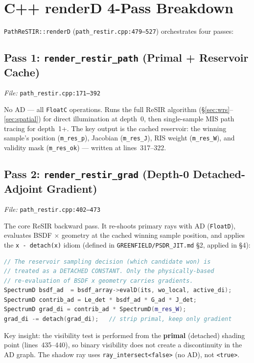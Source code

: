\section{C++ renderD 4-Pass Breakdown}
\label{sec:renderd}

\texttt{PathReSTIR::renderD} (\texttt{path\_restir.cpp:479--527}) orchestrates
four passes:

\subsection{Pass 1: \texttt{render\_restir\_path} (Primal + Reservoir Cache)}

\emph{File:} \texttt{path\_restir.cpp:171--392}

No AD --- all \texttt{FloatC} operations. Runs the full ReSIR algorithm
(\S\ref{sec:wrs}--\ref{sec:spatial}) for direct illumination at depth~0,
then single-sample MIS path tracing for depth~1+. The key output is the
cached reservoir: the winning sample's position (\texttt{m\_res\_p}),
Jacobian (\texttt{m\_res\_J}), RIS weight (\texttt{m\_res\_W}), and validity
mask (\texttt{m\_res\_ok}) --- written at lines~317--322.

\subsection{Pass 2: \texttt{render\_restir\_grad} (Depth-0 Detached-Adjoint Gradient)}
\label{sec:gradpass}

\emph{File:} \texttt{path\_restir.cpp:402--473}

The core ReSIR backward pass. It re-shoots primary rays with AD
(\texttt{FloatD}), evaluates BSDF $\times$ geometry at the cached winning
sample position, and applies the \texttt{x - detach(x)} idiom (defined in \texttt{GREENFIELD/PSDR\_JIT.md} \S2, applied in \S4):

\begin{lstlisting}[language=C++,basicstyle=\footnotesize\ttfamily]
// The reservoir sampling decision (which candidate won) is
// treated as a DETACHED CONSTANT. Only the physically-based
// re-evaluation of BSDF x geometry carries gradients.
SpectrumD bsdf_ad  = bsdf_array->evalD(its, wo_local, active_di);
SpectrumD contrib_ad = Le_det * bsdf_ad * G_ad * J_det;
SpectrumD grad_di = contrib_ad * SpectrumD(m_res_W);
grad_di -= detach(grad_di);   // strip primal, keep only gradient
\end{lstlisting}

Key insight: the visibility test is performed from the \textbf{primal}
(detached) shading point (lines~435--440), so binary visibility does not
create a discontinuity in the AD graph. The shadow ray uses
\texttt{ray\_intersect<false>} (no AD), not \texttt{<true>}.

